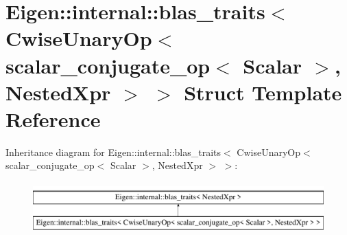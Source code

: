 \hypertarget{struct_eigen_1_1internal_1_1blas__traits_3_01_cwise_unary_op_3_01scalar__conjugate__op_3_01_scal305db6e51b207e2ce8fc6ea06996a706}{}\section{Eigen\+::internal\+::blas\+\_\+traits$<$ Cwise\+Unary\+Op$<$ scalar\+\_\+conjugate\+\_\+op$<$ Scalar $>$, Nested\+Xpr $>$ $>$ Struct Template Reference}
\label{struct_eigen_1_1internal_1_1blas__traits_3_01_cwise_unary_op_3_01scalar__conjugate__op_3_01_scal305db6e51b207e2ce8fc6ea06996a706}
Inheritance diagram for Eigen\+::internal\+::blas\+\_\+traits$<$ Cwise\+Unary\+Op$<$ scalar\+\_\+conjugate\+\_\+op$<$ Scalar $>$, Nested\+Xpr $>$ $>$\+:\begin{figure}[H]
\begin{center}
\leavevmode
\includegraphics[height=2.000000cm]{struct_eigen_1_1internal_1_1blas__traits_3_01_cwise_unary_op_3_01scalar__conjugate__op_3_01_scal305db6e51b207e2ce8fc6ea06996a706}
\end{center}
\end{figure}
